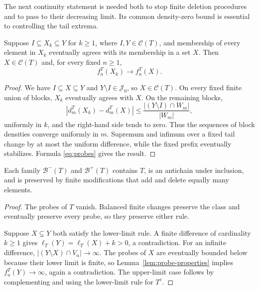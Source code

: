 The next continuity statement is needed both to stop finite deletion
procedures and to pass to their decreasing limit. Its common
density-zero bound is essential to controlling the tail extrema.

\begin{lemma}\label{lem:block-continuity}
Suppose $I\subseteq X_k\subseteq Y$ for $k\ge1$, where
$I,Y\in\mathcal C(T)$, and membership of every element in $X_k$
eventually agrees with its membership in a set $X$. Then
$X\in\mathcal C(T)$ and, for every fixed $n\ge1$,
\[
 f_n^T(X_k)\longrightarrow f_n^T(X).
\]
\end{lemma}

\begin{proof}
We have $I\subseteq X\subseteq Y$ and $Y\setminus I\in\mathcal J_0$,
so $X\in\mathcal C(T)$. On every fixed finite union of blocks, $X_k$
eventually agrees with $X$. On the remaining blocks,
\[
 |d_m^T(X_k)-d_m^T(X)|
 \le \frac{|(Y\setminus I)\cap W_m|}{|W_m|},
\]
uniformly in $k$, and the right-hand side tends to zero. Thus the
sequences of block densities converge uniformly in $m$. Supremum and
infimum over a fixed tail change by at most the uniform difference,
while the fixed prefix eventually stabilizes. Formula
\eqref{eq:probes} gives the result.
\end{proof}

\begin{lemma}\label{lem:local-antichain}
Each family $\mathcal B^-(T)$ and $\mathcal B^+(T)$ contains $T$, is
an antichain under inclusion, and is preserved by finite modifications
that add and delete equally many elements.
\end{lemma}

\begin{proof}
The probes of $T$ vanish. Balanced finite changes preserve the class
and eventually preserve every probe, so they preserve either rule.

Suppose $X\subsetneq Y$ both satisfy the lower-limit rule. A finite
difference of cardinality $k\ge1$ gives
$\ell_T(Y)=\ell_T(X)+k>0$, a contradiction. For an infinite difference,
$|(Y\setminus X)\cap V_n|\to\infty$. The probes of $X$ are eventually
bounded below because their lower limit is finite, so
Lemma~\ref{lem:probe-properties} implies $f_n^T(Y)\to\infty$, again
a contradiction. The upper-limit case follows by complementing and
using the lower-limit rule for $T^c$.
\end{proof}

